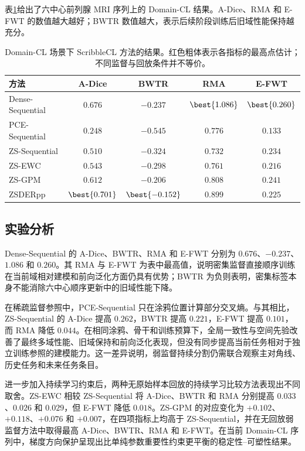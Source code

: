 表\ref{tab:scribblecl-domain-results}给出了六中心前列腺 MRI 序列上的 Domain-CL 结果。A-Dice、RMA 和 E-FWT 的数值越大越好；BWTR 数值越大，表示后续阶段训练后旧域性能保持越充分。

\begin{table}[htbp]
\centering
\caption{Domain-CL 场景下 ScribbleCL 方法的结果。红色粗体表示各指标的最高点估计；不同监督与回放条件并不等价。}
\label{tab:scribblecl-domain-results}
\thesistablefont
\renewcommand{\arraystretch}{1.14}
\setlength{\tabcolsep}{3pt}
\begin{tabular}{lcccc}
\toprule
方法 & A-Dice & BWTR & RMA & E-FWT \\
\midrule
Dense-Sequential & $0.676$ & $-0.237$ & $\best{1.086}$ & $\best{0.260}$ \\
PCE-Sequential & $0.248$ & $-0.545$ & $0.776$ & $0.133$ \\
ZS-Sequential & $0.510$ & $-0.324$ & $0.732$ & $0.234$ \\
ZS-EWC & $0.543$ & $-0.298$ & $0.761$ & $0.216$ \\
ZS-GPM & $0.612$ & $-0.206$ & $0.808$ & $0.241$ \\
ZSDERpp & $\best{0.701}$ & $\best{-0.152}$ & $0.899$ & $0.225$ \\
\bottomrule
\end{tabular}
\end{table}

\subsection{实验分析}
\label{subsec:scribblecl-experimental-analysis}

Dense-Sequential 的 A-Dice、BWTR、RMA 和 E-FWT 分别为 $0.676$、$-0.237$、$1.086$ 和 $0.260$。其 RMA 与 E-FWT 为表中最高值，说明密集监督直接顺序训练在当前域相对建模和前向泛化方面仍具有优势；BWTR 为负则表明，密集标签本身不能消除六中心顺序更新中的旧域性能下降。

在稀疏监督参照中，PCE-Sequential 只在涂鸦位置计算部分交叉熵。与其相比，ZS-Sequential 的 A-Dice 提高 $0.262$，BWTR 提高 $0.221$，E-FWT 提高 $0.101$，而 RMA 降低 $0.044$。在相同涂鸦、骨干和训练预算下，全局一致性与空间先验改善了最终多域性能、旧域保持和前向泛化表现，但没有同步提高当前任务相对于独立训练参照的建模能力。这一差异说明，弱监督持续分割仍需联合观察主对角线、历史任务和未来任务条目。

进一步加入持续学习约束后，两种无原始样本回放的持续学习比较方法表现出不同取舍。ZS-EWC 相较 ZS-Sequential 将 A-Dice、BWTR 和 RMA 分别提高 $0.033$、$0.026$ 和 $0.029$，但 E-FWT 降低 $0.018$。ZS-GPM 的对应变化为 $+0.102$、$+0.118$、$+0.076$ 和 $+0.007$，在四项指标上均高于 ZS-Sequential，并在无回放弱监督方法中取得最高 A-Dice、BWTR、RMA 和 E-FWT。在当前 Domain-CL 序列中，梯度方向保护呈现出比单纯参数重要性约束更平衡的稳定性--可塑性结果。

